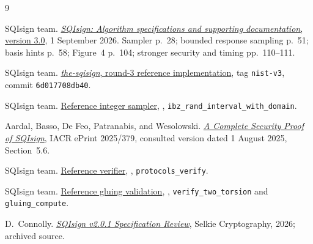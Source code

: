 \documentclass[a4paper,11pt]{article}
\newcommand{\code}[1]{\texttt{#1}}
\begin{document}
{}
\begin{thebibliography}{9}
\small\raggedright

SQIsign team.
\href{https://sqisign.org/spec/sqisign-20260901.pdf}{\emph{SQIsign:
Algorithm specifications and supporting documentation}, version 3.0},
1 September 2026. Sampler p.~28; bounded response sampling p.~51;
basis hints p.~58; Figure~4 p.~104; stronger security and timing
pp.~110--111.

SQIsign team.
\href{https://github.com/SQISign/the-sqisign/tree/6d017708db403bf83977fa70770fc4f7f9e9ff21}{\emph{the-sqisign}, round-3 reference implementation},
tag \code{nist-v3}, commit \code{6d017708db40}.

SQIsign team.
\href{https://github.com/SQISign/the-sqisign/blob/6d017708db403bf83977fa70770fc4f7f9e9ff21/src/mp/ref/lvlx/mp.c\#L1711}{Reference integer sampler},
, \code{ibz\_rand\_interval\_with\_domain}.

Aardal, Basso, De Feo, Patranabis, and Wesolowski.
\href{https://eprint.iacr.org/2025/379}{\emph{A Complete Security Proof of SQIsign}},
IACR ePrint 2025/379, consulted version dated 1 August 2025, Section~5.6.

SQIsign team.
\href{https://github.com/SQISign/the-sqisign/blob/6d017708db403bf83977fa70770fc4f7f9e9ff21/src/verification/ref/lvlx/verify.c}{Reference verifier},
, \code{protocols\_verify}.

SQIsign team.
\href{https://github.com/SQISign/the-sqisign/blob/6d017708db403bf83977fa70770fc4f7f9e9ff21/src/hd/ref/lvlx/gluing.c}{Reference gluing validation},
, \code{verify\_two\_torsion} and
\code{gluing\_compute}.

D.~Connolly.
\href{https://github.com/selkie-cryptography/sqisign-selkie/blob/16d7299bd096771ae5661b9fc21c5c98bbda39fd/latex/sqisign-v2-spec-review.tex}{\emph{SQIsign v2.0.1 Specification Review}},
Selkie Cryptography, 2026; archived source.

\end{thebibliography}
\end{document}
